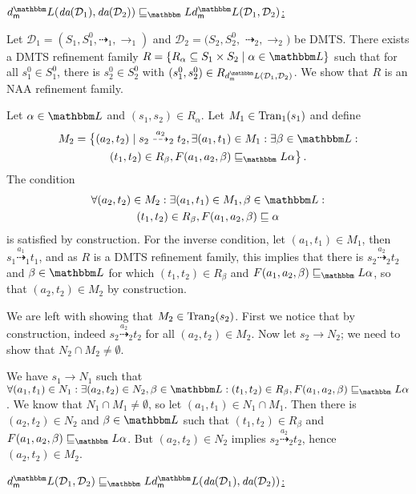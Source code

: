 \documentclass[twocolumn]{svjour3-dummy}
\newcommand*{\must}[1]{\overset{#1}{\longrightarrow}}
\newcommand*{\omust}{\mathord{\must{}}}
\newcommand*\cD{\mathcal D}
\newcommand*{\may}[1]{\overset{#1}{\dashrightarrow}}
\newcommand*{\omay}{\mathord{\may{}}}
\newcommand*\NAA{NAA\xspace}
\newcommand*\Tran{\textup{\textrm{Tran}}}
\newcommand*\db{\textit{da}} \newcommand*\bd{\textit{ad}} \newcommand*\bigmid{\mathrel{\big|}}
\newcommand*\LL{\mathbbm L}
\begin{document}
  \noindent \underline{$\mdl( \db( \cD_1), \db(
    \cD_2))\sqsubseteq_\LL \mdl( \cD_1, \cD_2)$:}

  Let $\cD_1=( S_1, S^0_1, \omay_1, \omust_1)$ and $\cD_2=( S_2, S^0_2,$
  $\omay_2, \omust_2)$ be DMTS.  There exists a DMTS refinement family
  $R=\{ R_\alpha\subseteq S_1\times S_2\mid \alpha\in \LL\}$ such that
  for all $s^0_1\in S^0_1$, there is $s^0_2\in S^0_2$ with $( s^0_1,
  s^0_2)\in R_{ \mdl( \cD_1, \cD_2)}$.  We show that $R$ is an \NAA
  refinement family.

  Let $\alpha\in \LL$ and $( s_1, s_2)\in R_\alpha$.  Let $M_1\in
  \Tran_1( s_1)$ and define
  \begin{multline*}
    M_2= \big\{ ( a_2, t_2)\mid s_2\may{ a_2}_2 t_2, \exists( a_1, t_1)\in
    M_1: \exists \beta\in \LL: \\
    ( t_1, t_2)\in R_\beta, F( a_1, a_2, \beta)\sqsubseteq_\LL \alpha\big\}\,.
  \end{multline*}
  The condition
  \begin{multline*}
    \forall( a_2, t_2)\in M_2: \exists( a_1, t_1)\in M_1, \beta\in
    \LL: \\
    ( t_1, t_2)\in R_\beta, F( a_1, a_2, \beta)\sqsubseteq \alpha
  \end{multline*}
  is satisfied by construction.  For the inverse condition, let $( a_1,
  t_1)\in M_1$, then $s_1\may{ a_1}_1 t_1$, and as $R$ is a DMTS
  refinement family, this implies that there is $s_2\may{ a_2}_2 t_2$
  and $\beta\in \LL$ for which $( t_1, t_2)\in R_\beta$ and $F( a_1,
  a_2, \beta)\sqsubseteq_\LL \alpha$, so that $( a_2, t_2)\in M_2$ by
  construction.

  We are left with showing that $M_2\in \Tran_2( s_2)$.  First we notice
  that by construction, indeed $s_2\may{a_2}_2 t_2$ for all $( a_2,
  t_2)\in M_2$.  Now let $s_2\must{} N_2$; we need to show that $N_2\cap
  M_2\ne \emptyset$.

  We have $s_1\must{} N_1$ such that $\forall( a_1, t_1)\in N_1:
  \exists( a_2, t_2)\in N_2, \beta\in \LL:( t_1, t_2)\in R_\beta, F(
  a_1, a_2, \beta)\sqsubseteq_\LL \alpha$.  We know that $N_1\cap M_1\ne
  \emptyset$, so let $( a_1, t_1)\in N_1\cap M_1$.  Then there is $(
  a_2, t_2)\in N_2$ and $\beta\in \LL$ such that $( t_1, t_2)\in
  R_\beta$ and $F( a_1, a_2, \beta)\sqsubseteq_\LL \alpha$.  But $( a_2,
  t_2)\in N_2$ implies $s_2\may{ a_2}_2 t_2$, hence $( a_2, t_2)\in
  M_2$.

  \medskip \noindent \underline{$\mdl( \cD_1, \cD_2)\sqsubseteq_\LL
    \mdl( \db( \cD_1), \db( \cD_2))$:}
\end{document}
